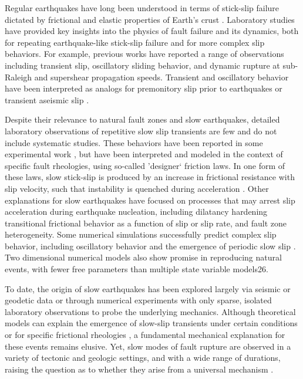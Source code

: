Regular earthquakes have long been understood in terms of stick-slip failure dictated by frictional and elastic properties of Earth's crust \cite{Brace_1966}. Laboratory studies have provided key insights into the physics of fault failure and its dynamics, both for repeating earthquake-like stick-slip failure and for more complex slip behaviors. For example, previous works have reported a range of observations including transient slip, oscillatory sliding behavior, and dynamic rupture at sub-Raleigh and supershear propagation speeds\cite{voisin2008evolution, shimamoto1986transition, baumberger1994crossover, kaproth2013slow, ben2010slip, passelegue2013sub, scholz1972detailed}.  Transient and oscillatory behavior have been interpreted as analogs for premonitory slip prior to earthquakes or transient aseismic slip \cite{voisin2008evolution, scholz1972detailed,rubin2011designer}.  

Despite their relevance to natural fault zones and slow earthquakes, detailed laboratory observations of repetitive slow slip transients are few and do not include systematic studies. These behaviors have been reported in some experimental work \cite{voisin2008evolution, baumberger1994crossover, kaproth2013slow}, but have been interpreted and modeled in the context of specific fault rheologies, using so-called 'designer` friction laws. In one form of these laws, slow stick-slip is produced by an increase in frictional resistance with slip velocity, such that instability is quenched during acceleration \cite{baumberger1994crossover, kaproth2013slow, rubin2011designer}.  Other explanations for slow earthquakes have focused on processes that may arrest slip acceleration during earthquake nucleation, including dilatancy hardening \cite{liu2007spontaneous,segall2010dilatant} transitional frictional behavior as a function of slip \cite{ikari2013slip} or slip rate, and fault zone heterogeneity.  Some numerical simulations successfully predict complex slip behavior, including oscillatory behavior and the emergence of periodic slow slip \cite{liu2007spontaneous,gu1984slip}. Two dimensional numerical models also show promise in reproducing natural events, with fewer free parameters than multiple state variable models26. 

To date, the origin of slow earthquakes has been explored largely via seismic or geodetic data or through numerical experiments with only sparse, isolated laboratory observations to probe the underlying mechanics.  Although theoretical models can explain the emergence of slow-slip transients under certain conditions or for specific frictional rheologies \cite{liu2007spontaneous,segall2010dilatant,gu1984slip}, a fundamental mechanical explanation for these events remains elusive. Yet, slow modes of fault rupture are observed in a variety of tectonic and geologic settings, and with a wide range of durations, raising the question as to whether they arise from a universal mechanism \cite{peng2010integrated,den2012new}. 

